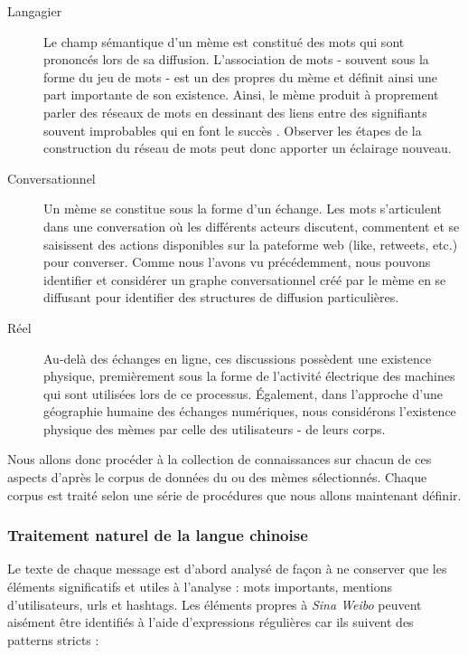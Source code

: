     \begin{description}
        \item[Langagier]
        Le champ sémantique d{\textquoteright}un mème est constitué des mots qui sont prononcés lors de sa diffusion. L{\textquoteright}association de mots - souvent sous la forme du jeu de mots - est un des propres du mème et définit ainsi une part importante de son existence. Ainsi, le mème produit à proprement parler des réseaux de mots en dessinant des liens entre des signifiants souvent improbables qui en font le succès \citep{Bauckhage2011}. Observer les étapes de la construction du réseau de mots peut donc apporter un éclairage nouveau.

        \item[Conversationnel] 
        Un mème se constitue sous la forme d{\textquoteright}un échange. Les mots s'articulent dans une conversation o\`u les différents acteurs discutent, commentent et se saisissent des actions disponibles sur la pateforme web (like, retweets, etc.) pour converser. Comme nous l{\textquoteright}avons vu précédemment, nous pouvons identifier et considérer un graphe conversationnel créé par le mème en se diffusant pour identifier des structures de diffusion particulières. 

        \item[Réel] 
        Au-delà des échanges en ligne, ces discussions possèdent une existence physique, premièrement sous la forme de l{\textquoteright}activité électrique des machines qui sont utilisées lors de ce processus. \'Egalement, dans l{\textquoteright}approche d{\textquoteright}une géographie humaine des échanges numériques, nous considérons l{\textquoteright}existence physique des mèmes par celle des utilisateurs - de leurs corps. 
    \end{description}

    Nous allons donc procéder à la collection de connaissances sur chacun de ces aspects d'après le corpus de données du ou des mèmes sélectionnés. Chaque corpus est traité selon une série de procédures que nous allons maintenant définir. 

\subsubsection[Traitement naturel de la langue chinoise]{Traitement naturel de la langue chinoise}

    Le texte de chaque message est d'abord analysé de fa\c{c}on à ne conserver que les éléments significatifs et utiles à l'analyse : mots importants, mentions d'utilisateurs, urls et hashtags. Les éléments propres à \textit{Sina Weibo} peuvent aisément être identifiés à l'aide d'expressions régulières car ils suivent des patterns stricts : 

